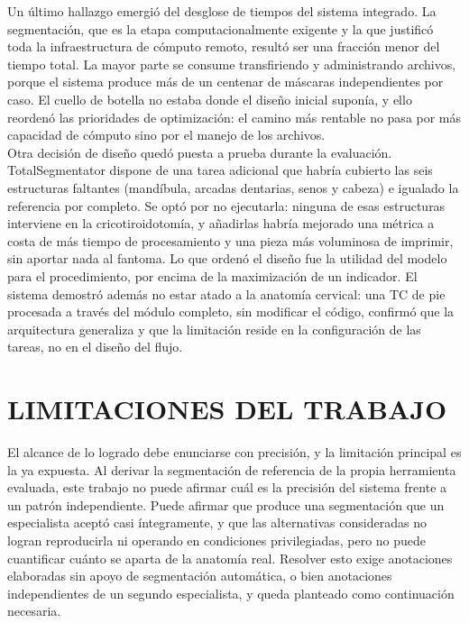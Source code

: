 Un último hallazgo emergió del desglose de tiempos del sistema integrado. La segmentación, que es la etapa computacionalmente exigente y la que justificó toda la infraestructura de cómputo remoto, resultó ser una fracción menor del tiempo total. La mayor parte se consume transfiriendo y administrando archivos, porque el sistema produce más de un centenar de máscaras independientes por caso. El cuello de botella no estaba donde el diseño inicial suponía, y ello reordenó las prioridades de optimización: el camino más rentable no pasa por más capacidad de cómputo sino por el manejo de los archivos.\\

Otra decisión de diseño quedó puesta a prueba durante la evaluación. TotalSegmentator dispone de una tarea adicional que habría cubierto las seis estructuras faltantes (mandíbula, arcadas dentarias, senos y cabeza) e igualado la referencia por completo. Se optó por no ejecutarla: ninguna de esas estructuras interviene en la cricotiroidotomía, y añadirlas habría mejorado una métrica a costa de más tiempo de procesamiento y una pieza más voluminosa de imprimir, sin aportar nada al fantoma. Lo que ordenó el diseño fue la utilidad del modelo para el procedimiento, por encima de la maximización de un indicador. El sistema demostró además no estar atado a la anatomía cervical: una TC de pie procesada a través del módulo completo, sin modificar el código, confirmó que la arquitectura generaliza y que la limitación reside en la configuración de las tareas, no en el diseño del flujo.\\

\section{LIMITACIONES DEL TRABAJO}

El alcance de lo logrado debe enunciarse con precisión, y la limitación principal es la ya expuesta. Al derivar la segmentación de referencia de la propia herramienta evaluada, este trabajo no puede afirmar cuál es la precisión del sistema frente a un patrón independiente. Puede afirmar que produce una segmentación que un especialista aceptó casi íntegramente, y que las alternativas consideradas no logran reproducirla ni operando en condiciones privilegiadas, pero no puede cuantificar cuánto se aparta de la anatomía real. Resolver esto exige anotaciones elaboradas sin apoyo de segmentación automática, o bien anotaciones independientes de un segundo especialista, y queda planteado como continuación necesaria.\\

